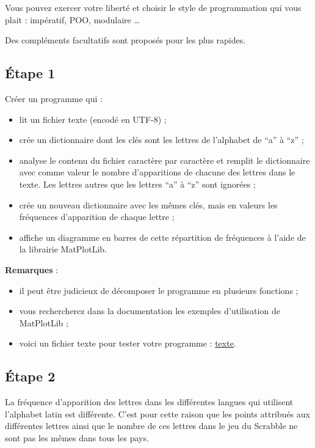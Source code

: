 \documentclass[
  letterpaper,
  DIV=11,
  numbers=noendperiod]{scrartcl}
\providecommand{\tightlist}{%
  \setlength{\itemsep}{0pt}\setlength{\parskip}{0pt}}\usepackage{longtable,booktabs,array}
\begin{document}
Vous pouvez exercer votre liberté et choisir le style de programmation
qui vous plait : impératif, POO, modulaire \ldots{}

Des compléments facultatifs sont proposés pour les plus rapides.

\hypertarget{uxe9tape-1}{%
\subsection{Étape 1}\label{uxe9tape-1}}

Créer un programme qui :

\begin{itemize}
\tightlist
\item
  lit un fichier texte (encodé en UTF-8) ;
\item
  crée un dictionnaire dont les clés sont les lettres de l'alphabet de
  ``a'' à ``z'' ;
\item
  analyse le contenu du fichier caractère par caractère et remplit le
  dictionnaire avec comme valeur le nombre d'apparitions de chacune des
  lettres dans le texte. Les lettres autres que les lettres ``a'' à
  ``z'' sont ignorées ;
\item
  crée un nouveau dictionnaire avec les mêmes clés, mais en valeurs les
  fréquences d'apparition de chaque lettre ;
\item
  affiche un diagramme en barres de cette répartition de fréquences à
  l'aide de la librairie MatPlotLib.
\end{itemize}

\textbf{Remarques} :

\begin{itemize}
\tightlist
\item
  il peut être judicieux de décomposer le programme en plusieurs
  fonctions ;
\item
  vous rechercherez dans la documentation les exemples d'utilisation de
  MatPlotLib ;
\item
  voici un fichier texte pour tester votre programme :
  \href{texteFR.txt}{texte}.
\end{itemize}

\hypertarget{uxe9tape-2}{%
\subsection{Étape 2}\label{uxe9tape-2}}

La fréquence d'apparition des lettres dans les différentes langues qui
utilisent l'alphabet latin est différente. C'est pour cette raison que
les points attribués aux différentes lettres ainsi que le nombre de ces
lettres dans le jeu du Scrabble ne sont pas les mêmes dans tous les
pays.
\end{document}
